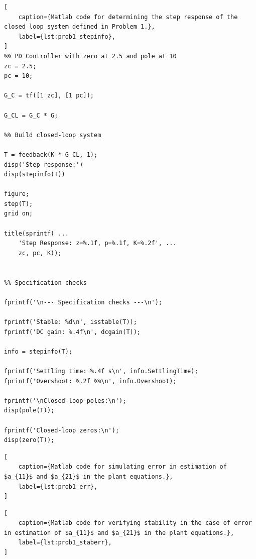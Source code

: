 \documentclass[11pt,a4paper]{article}
\begin{document}
\begin{lstlisting}[
    caption={Matlab code for determining the step response of the closed loop system defined in Problem 1.},
    label={lst:prob1_stepinfo},
]
%% PD Controller with zero at 2.5 and pole at 10
zc = 2.5;
pc = 10;

G_C = tf([1 zc], [1 pc]);

G_CL = G_C * G;

%% Build closed-loop system

T = feedback(K * G_CL, 1);
disp('Step response:')
disp(stepinfo(T))

figure;
step(T);
grid on;

title(sprintf( ...
    'Step Response: z=%.1f, p=%.1f, K=%.2f', ...
    zc, pc, K));


%% Specification checks

fprintf('\n--- Specification checks ---\n');

fprintf('Stable: %d\n', isstable(T));
fprintf('DC gain: %.4f\n', dcgain(T));

info = stepinfo(T);

fprintf('Settling time: %.4f s\n', info.SettlingTime);
fprintf('Overshoot: %.2f %%\n', info.Overshoot);

fprintf('\nClosed-loop poles:\n');
disp(pole(T));

fprintf('Closed-loop zeros:\n');
disp(zero(T));
\end{lstlisting}

\begin{lstlisting}[
    caption={Matlab code for simulating error in estimation of $a_{11}$ and $a_{21}$ in the plant equations.},
    label={lst:prob1_err},
]
\end{lstlisting}

\begin{lstlisting}[
    caption={Matlab code for verifying stability in the case of error in estimation of $a_{11}$ and $a_{21}$ in the plant equations.},
    label={lst:prob1_staberr},
]
\end{lstlisting}
\end{document}
